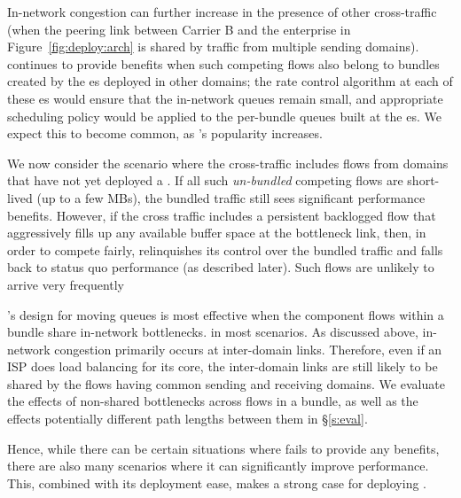  In-network congestion can further increase in the presence of other cross-traffic (\eg when the peering link between Carrier B and the enterprise in Figure~\ref{fig:deploy:arch} is shared by traffic from multiple sending domains). \name continues to provide benefits when such competing flows also belong to bundles created by the {\inbox}es deployed in other domains; the rate control algorithm at each of these {\inbox}es would ensure that the in-network queues remain small, and appropriate scheduling policy would be applied to the per-bundle queues built at the {\inbox}es.
We expect this to become common, as \name's popularity increases. 

 We now consider the scenario where the cross-traffic includes flows from domains that have not yet deployed a \name. If all such \emph{un-bundled} competing flows are short-lived (up to a few MBs), the bundled traffic still sees significant performance benefits. However, if the cross traffic includes a persistent backlogged flow that aggressively fills up any available buffer space at the bottleneck link, then, in order to compete fairly, \name relinquishes its control over the bundled traffic and falls back to status quo performance (as described later). Such flows are unlikely to arrive very frequently


 \name's design for moving queues is most effective when the component flows within a bundle share in-network bottlenecks. 
 in most scenarios. 
As discussed above, in-network congestion primarily occurs at inter-domain links. Therefore, even if an ISP does load balancing for its core, the inter-domain links are still likely to be shared by the flows having common sending and receiving domains. We evaluate the effects of non-shared bottlenecks across flows in a bundle, as well as the effects potentially different path lengths between them in \S\ref{s:eval}. 

\vspace{0.05in}
\noindent Hence, while there can be certain situations where \name fails to provide any benefits, there are also many scenarios where it can significantly improve performance. This, combined with its deployment ease, makes a strong case for deploying \name. 


